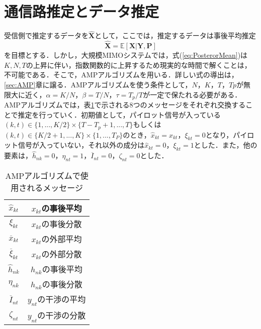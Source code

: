 \section{通信路推定とデータ推定}
受信側で推定するデータを$\hat{\boldsymbol{X}}$として，ここでは，推定するデータは事後平均推定
\begin{equation} 
	\label{eq:PosterorMean}
	\hat{\boldsymbol{X}}=\mathbb{E}[\boldsymbol{X}|\boldsymbol{Y},\boldsymbol{P}]
\end{equation}	
を目標とする．しかし，大規模MIMOシステムでは，式(\ref{eq:PosterorMean})は$K,N,T$の上昇に伴い，指数関数的に上昇するため現実的な時間で解くことは，不可能である．そこで，AMPアルゴリズムを用いる．詳しい式の導出は，\ref{sec:AMP}章に譲る．AMPアルゴリズムを使う条件として，$N，K，T，Tp$が無限大に近く，$\alpha=K/N$，$\beta=T/N$，$\tau=T_{p}/T$が一定で保たれる必要がある．AMPアルゴリズムでは，表\ref{tb:Message}で示される8つのメッセージをそれぞれ交換することで推定を行っていく．初期値として，パイロット信号が入っている$(k,t) \in \{1,...,K/2\}\times \{T-T_{p}+1,...,T\}$もしくは$(k,t) \in \{K/2+1,...,K\}\times \{1,...,T_{P}\}$のとき，$\hat{x}_{kt}=x_{kt}$，$\xi_{kt}=0$となり，パイロット信号が入っていない，それ以外の成分は$\hat{x}_{kt}=0$，$\xi_{kt}=1$とした．また，他の要素は，$\hat{h}_{nk}=0$，$\eta_{nt}=1$，$\overline{I}_{nt}=0$，$\zeta_{nt}=0$とした．
\begin{table}[htb]
	\begin{center}
		\caption{AMPアルゴリズムで使用されるメッセージ \label{tb:Message}}
		\begin{tabular}{|c|c|} \hline
			$\hat{x}_{kt}$ & $x_{kt}$の事後平均 \\ \hline
			$\xi_{kt}$ & $x_{kt}$の事後分散 \\ \hline
			$\overline{x}_{kt}$ & $x_{kt}$の外部平均 \\ \hline
			$\overline{\xi}_{kt}$ & $x_{kt}$の外部分散 \\ \hline\hline
			$\hat{h}_{nk}$ & $h_{nk}$の事後平均 \\ \hline
			$\eta_{nk}$ & $h_{nk}$の事後分散 \\ \hline\hline
			$\overline{I}_{nt}$ & $y_{nt}$の干渉の平均 \\ \hline
			$\zeta_{nt}$ & $y_{nt}$の干渉の分散 \\ \hline
		\end{tabular}
	\end{center}
\end{table}

